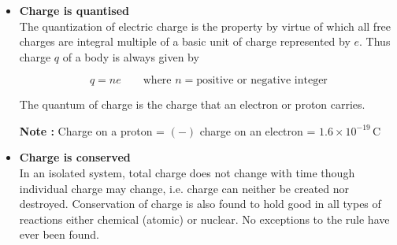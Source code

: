 \begin{frame}[t]
	\frametitle{}
	
	\begin{itemize}
		\item \textbf{Charge is quantised} \\
		The quantization of electric charge is the property by virtue of which all free charges are integral multiple of a basic unit of charge represented by $e$. Thus charge $q$ of a body is always given by
		
		\vspace{0.5em}
		\[
		q = ne \qquad \text{where } n = \text{positive or negative integer}
		\]
		
		\vspace{0.5em}
		The quantum of charge is the charge that an electron or proton carries.
		
		\vspace{0.3em}
		\textbf{Note :} Charge on a proton = $(-)$ charge on an electron = $1.6 \times 10^{-19}\,\text{C}$
		
		\vspace{1em}
		
		\item \textbf{Charge is conserved} \\
		In an isolated system, total charge does not change with time though individual charge may change, i.e. charge can neither be created nor destroyed. Conservation of charge is also found to hold good in all types of reactions either chemical (atomic) or nuclear. No exceptions to the rule have ever been found.
	\end{itemize}
	
\end{frame}

